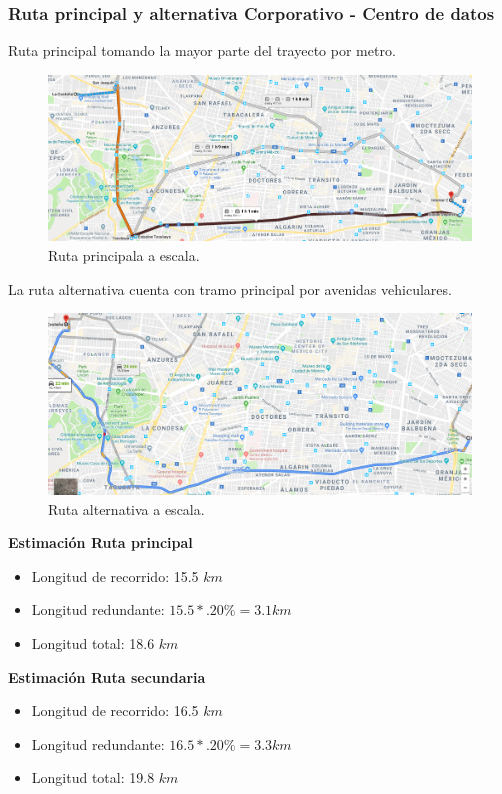 \documentclass[12pt,letterpaper]{article}
\begin{document}
\subsubsection{Ruta principal y alternativa Corporativo - Centro de datos }
Ruta principal tomando la mayor parte del trayecto por metro.
\begin{figure}[ht]
    \centering
    \includegraphics[width=.9\textwidth]{imagenes/f2.png}
    \caption{Ruta principala a escala.}
\end{figure}

La ruta alternativa cuenta con tramo principal por avenidas 
vehiculares.
\begin{figure}[ht]
    \centering
    \includegraphics[width=.9\textwidth]{imagenes/f3.png}
    \caption{Ruta alternativa a escala.}
\end{figure}

\newpage
\textbf{Estimación Ruta principal}
\begin{itemize}
    \item Longitud de recorrido: 15.5 $km$
    \item Longitud redundante: $15.5*.20\%=3.1km$
    \item Longitud total: 18.6 $km$
\end{itemize}

\textbf{Estimación Ruta secundaria}\\
\begin{itemize}
    \item Longitud de recorrido: 16.5 $km$
    \item Longitud redundante: $16.5*.20\%=3.3km$
    \item Longitud total: 19.8 $km$ 
\end{itemize}
\end{document}
